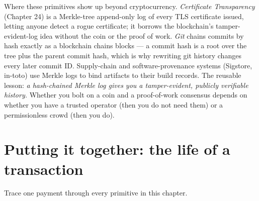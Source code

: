 \begin{applicationbox}
Where these primitives show up beyond cryptocurrency. \emph{Certificate Transparency} (Chapter 24) is a Merkle-tree append-only log of every TLS certificate issued, letting anyone detect a rogue certificate; it borrows the blockchain's tamper-evident-log idea without the coin or the proof of work. \emph{Git} chains commits by hash exactly as a blockchain chains blocks --- a commit hash is a root over the tree plus the parent commit hash, which is why rewriting git history changes every later commit ID. Supply-chain and software-provenance systems (Sigstore, in-toto) use Merkle logs to bind artifacts to their build records. The reusable lesson: \emph{a hash-chained Merkle log gives you a tamper-evident, publicly verifiable history.} Whether you bolt on a coin and a proof-of-work consensus depends on whether you have a trusted operator (then you do not need them) or a permissionless crowd (then you do).
\end{applicationbox}

\section{Putting it together: the life of a transaction}
\label{ch36:lifecycle}

Trace one payment through every primitive in this chapter.

